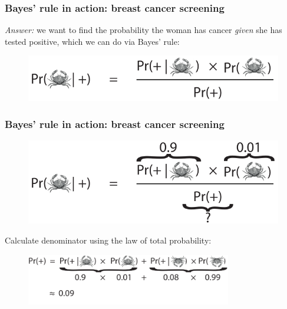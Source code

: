 \documentclass{beamer}
\begin{document}
	\begin{frame}
		\frametitle{Bayes' rule in action: breast cancer screening}
		
		\textit{Answer:} we want to find the probability the woman has cancer \textit{given} she has tested positive, which we can do via Bayes' rule:
		
		\begin{figure}[ht]
			\includegraphics[width=1\textwidth]{./figures/lec1_cancer.pdf}
		\end{figure}
		
	\end{frame}
	
	\begin{frame}
		\frametitle{Bayes' rule in action: breast cancer screening}
		
		\begin{figure}[ht]
			\includegraphics[width=1\textwidth]{./figures/lec1_cancer2.pdf}
		\end{figure}
	
		Calculate denominator using the law of total probability:
		
		\begin{figure}[ht]
			\includegraphics[width=0.8\textwidth]{./figures/lec1_cancer3.pdf}
		\end{figure}
		
	\end{frame}
	
\end{document}
